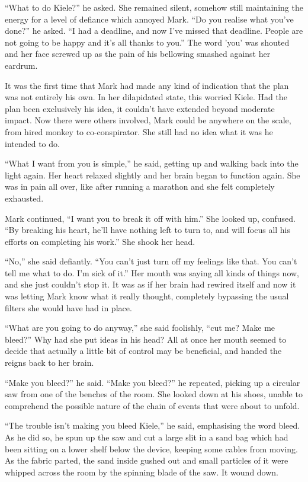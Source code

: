 ``What to do Kiele?'' he asked.  She remained silent, somehow still maintaining the energy for a level of defiance which annoyed Mark.  ``Do you realise what you've done?'' he asked.  ``I had a deadline, and now I've missed that deadline.  People are not going to be happy and it's all thanks to you.''  The word 'you' was shouted and her face screwed up as the pain of his bellowing smashed against her eardrum.

It was the first time that Mark had made any kind of indication that the plan was not entirely his own.  In her dilapidated state, this worried Kiele.  Had the plan been exclusively his idea, it couldn't have extended beyond moderate impact.  Now there were others involved, Mark could be anywhere on the scale, from hired monkey to co-conspirator.  She still had no idea what it was he intended to do.

``What I want from you is simple,'' he said, getting up and walking back into the light again.  Her heart relaxed slightly and her brain began to function again.  She was in pain all over, like after running a marathon and she felt completely exhausted.  

Mark continued, ``I want you to break it off with him.''  She looked up, confused.  ``By breaking his heart, he'll have nothing left to turn to, and will focus all his efforts on completing his work.''  She shook her head.

``No,'' she said defiantly.  ``You can't just turn off my feelings like that.  You can't tell me what to do.  I'm sick of it.''  Her mouth was saying all kinds of things now, and she just couldn't stop it.  It was as if her brain had rewired itself and now it was letting Mark know what it really thought, completely bypassing the usual filters she would have had in place.  

``What are you going to do anyway,'' she said foolishly, ``cut me?  Make me bleed?''  Why had she put ideas in his head?  All at once her mouth seemed to decide that actually a little bit of control may be beneficial, and handed the reigns back to her brain.

``Make you bleed?'' he said.  ``Make you bleed?'' he repeated, picking up a circular saw from one of the benches of the room.  She looked down at his shoes, unable to comprehend the possible nature of the chain of events that were about to unfold.  

``The trouble isn't making you bleed Kiele,'' he said, emphasising the word bleed.  As he did so, he spun up the saw and cut a large slit in a sand bag which had been sitting on a lower shelf below the device, keeping some cables from moving.  As the fabric parted, the sand inside gushed out and small particles of it were whipped across the room by the spinning blade of the saw.  It wound down.

